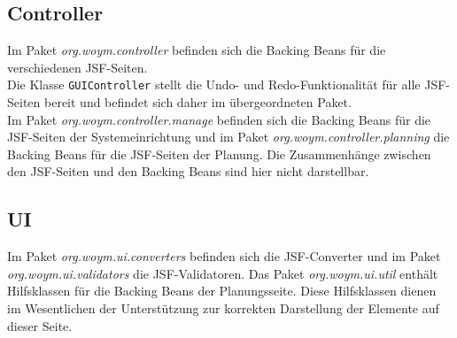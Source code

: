 \documentclass[fontsize=12pt,paper=a4,twoside]{scrartcl}
\begin{document}



\subsection{Controller}
\label{subsec:Controller}

Im Paket \textit{org.woym.controller} befinden sich die Backing Beans für die verschiedenen JSF-Seiten. \\
Die Klasse \texttt{GUIController} stellt die Undo- und Redo-Funktionalität für alle JSF-Seiten bereit und befindet sich daher im übergeordneten Paket.\\
Im Paket \textit{org.woym.controller.manage} befinden sich die Backing Beans für die JSF-Seiten der Systemeinrichtung und im Paket \textit{org.woym.controller.planning} die Backing Beans für die JSF-Seiten der Planung. Die Zusammenhänge zwischen den JSF-Seiten und den Backing Beans sind hier nicht darstellbar. 



\subsection{UI}
\label{subsec:UI}

Im Paket \textit{org.woym.ui.converters} befinden sich die JSF-Converter und im Paket \textit{org.woym.ui.validators} die JSF-Validatoren. Das Paket \textit{org.woym.ui.util} enthält Hilfsklassen für die Backing Beans der Planungsseite. Diese Hilfsklassen dienen im Wesentlichen der Unterstützung zur korrekten Darstellung der Elemente auf dieser Seite.\clearpage
\end{document}
